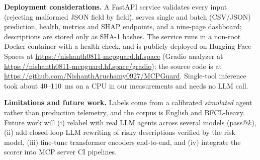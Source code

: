 \documentclass[conference]{IEEEtran}
\begin{document}
\textbf{Deployment considerations.} A FastAPI service validates every input (rejecting malformed JSON field by field), serves single and batch (CSV/JSON) prediction, health, metrics and SHAP endpoints, and a nine-page dashboard; descriptions are stored only as SHA-1 hashes. The service runs in a non-root Docker container with a health check, and is publicly deployed on Hugging Face Spaces at \url{https://nishanth0811-mcpguard.hf.space} (Gradio analyzer at \url{https://nishanth0811-mcpguard.hf.space/gradio}); the source code is at \url{https://github.com/NishanthAruchamy0927/MCPGuard}. Single-tool inference took about 40--110~ms on a CPU in our measurements and needs no LLM call.

\textbf{Limitations and future work.} Labels come from a calibrated \emph{simulated} agent rather than production telemetry, and the corpus is English and BFCL-heavy. Future work will (i) relabel with real LLM agents across several models (pass@$k$), (ii) add closed-loop LLM rewriting of risky descriptions verified by the risk model, (iii) fine-tune transformer encoders end-to-end, and (iv) integrate the scorer into MCP server CI pipelines.
\end{document}
